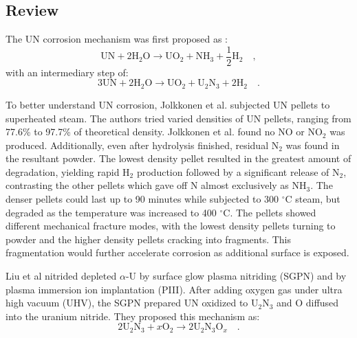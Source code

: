 \documentclass[11pt]{article}
\begin{document}
\begin{multicols}{2}
\section{Review}


\par 
The UN corrosion mechanism was first proposed as \cite{Dell1967,Sugihara1969}:
\begin{equation}
\mbox{UN} + 2\mbox{H}_{2}\mbox{O} \rightarrow \mbox{UO}_{2} + \mbox{NH}_{3} + \frac{1}{2} \mbox{H}_{2} \quad ,
\end{equation}
with an intermediary step of: 
\begin{equation}
3\mbox{UN}+2\mbox{H}_{2}\mbox{O} \rightarrow \mbox{UO}_{2}+\mbox{U}_{2}\mbox{N}_{3}+2\mbox{H}_{2} \quad .
\end{equation}

To better understand UN corrosion, Jolkkonen et al. \cite{Jolkkonen2017} subjected UN pellets to superheated steam. The authors tried varied densities of UN pellets, ranging from 77.6\% to 97.7\% of theoretical density. Jolkkonen et al. found no NO or NO$_{2}$ was produced. Additionally, even after hydrolysis finished, residual N$_{2}$ was found in the resultant powder. The lowest density pellet resulted in the greatest amount of degradation, yielding rapid H$_{2}$ production followed by a significant release of N$_{2}$, contrasting the other pellets which gave off N almost exclusively as NH$_{3}$. The denser pellets could last up to 90 minutes while subjected to 300 $^{\circ}$C steam, but degraded as the temperature was increased to 400 $^{\circ}$C. The pellets showed different mechanical fracture modes, with the lowest density pellets turning to powder and the higher density pellets cracking into fragments. This fragmentation would further accelerate corrosion as additional surface is exposed.
\par 

Liu et al \cite{Liu2013} nitrided depleted $\alpha$-U by surface glow plasma nitriding (SGPN) and by plasma immersion ion implantation (PIII). After adding oxygen gas under ultra high vacuum (UHV), the SGPN prepared UN oxidized to U$_{2}$N$_{3}$ and O diffused into the uranium nitride. They proposed this mechanism as:
\begin{equation}
2\mbox{U}_{2}\mbox{N}_{3} +x \mbox{O}_{2} \rightarrow 2\mbox{U}_{2}\mbox{N}_{3}\mbox{O}_{x} \quad .
\end{equation}


\end{multicols}
\end{document}
